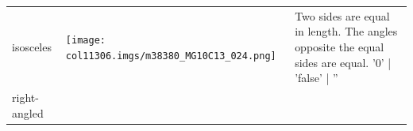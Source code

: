 \begin{table}[H]
\begin{center}
\begin{xtabular*}{\mytablewidth}[t]{|p{10\mystarwidth}|p{10\mystarwidth}|p{
10\mystarwidth}|}
    
        isosceles &
    
    
        
                  
    \setcounter{subfigure}{0}

\label{m38380*id317593}
    \begin{center}
   
\label{m38380*id317593!!!underscore!!!media}\label{
m38380*id317593!!!underscore!!!printimage}\texttt{[image: col11306.imgs/m38380\_MG10C13\_024.png]} %
        
      \vspace{2pt}
    \vspace{.1in}
    
    \end{center}



    \addtocounter{footnote}{-0}
    
                 &
    
    
        Two sides are equal in length. The angles opposite the equal sides are
equal.%
'0' | 'false' | ''
     \tabularnewline{}
    
    
        right-angled &
    
    
        
                  
    \setcounter{subfigure}{0}

\label{m38380*id317628}
    \begin{center}
   

\end{center}
\end{xtabular*}
\end{center}
\end{table}
